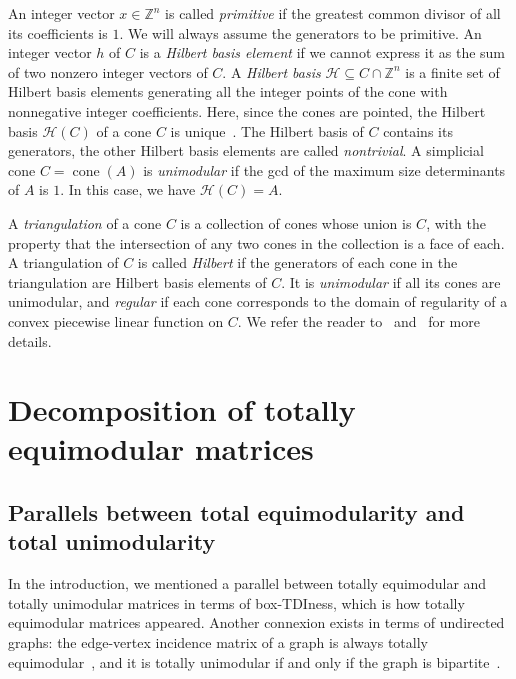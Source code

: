 \documentclass[11pt,a4paper]{amsart}
\theoremstyle{plain}
\theoremstyle{definition}
\newcommand{\cal}[1]{\mathcal{#1}}
\newcommand{\Z}{\mathbb{Z}}
\DeclareMathOperator{\cone}{cone}
\renewcommand{\cal}[1]{\mathcal{#1}}
\begin{document}



An integer vector $x\in\Z^n$ is called \emph{primitive} if the greatest common divisor of all its coefficients is $1$.
We will always assume the generators to be primitive.
An integer vector $h$ of $C$ is a \emph{Hilbert basis element} if we cannot express it as the sum of two nonzero integer vectors of $C$.
A \emph{Hilbert basis} $\cal{H}\subseteq C\cap\Z^n$ is a finite set of Hilbert basis elements generating all the integer points of the cone with nonnegative integer coefficients.
Here, since the cones are pointed, the Hilbert basis $\cal{H}(C)$ of a cone $C$ is unique~\cite{Schrijver1981}.
The Hilbert basis of $C$ contains its generators, the other Hilbert basis elements are called \emph{nontrivial}.
A simplicial cone $C=\cone (A)$ is \emph{unimodular} if the gcd of the maximum size determinants of $A$ is $1$.
In this case, we have $\cal H(C)=A$.

A \emph{triangulation} of a cone $C$ is a collection of cones whose union is $C$, with the property that the intersection of any two cones in the collection is a face of each.
A triangulation of $C$ is called \emph{Hilbert} if the generators of each cone in the triangulation are Hilbert basis elements of $C$.
It is \emph{unimodular} if all its cones are unimodular, and \emph{regular} if each cone corresponds to the domain of regularity of a convex piecewise linear function on $C$. We refer the reader to~\cite[Chap.~5]{Ziegler_1995} and~\cite[Chap.~8]{Sturmfels_1996} for more details.

\section{Decomposition of totally equimodular matrices}\label{section:decomposition}


\subsection{Parallels between total equimodularity and total unimodularity}\label{subsection:parallel_TE_TU}
In the introduction, we mentioned a parallel between totally equimodular and totally unimodular matrices in terms of box-TDIness, which is how totally equimodular matrices appeared.
Another connexion exists in terms of undirected graphs: the edge-vertex incidence matrix of a graph is always totally equimodular~\cite{Chervet_Grappe_Lacroix_Pisanu_Wolfler-Calvo_2023}, and it is totally unimodular if and only if the graph is bipartite~\cite{hoffmanKruskal:1956}.
\end{document}
